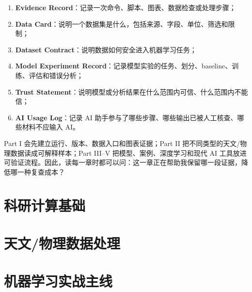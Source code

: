 \documentclass[11pt,a4paper,openany,fontset=fandol]{ctexbook}
\begin{document}
\begin{enumerate}
    \item \textbf{Evidence Record}：记录一次命令、脚本、图表、数据检查或处理步骤；
    \item \textbf{Data Card}：说明一个数据集是什么，包括来源、字段、单位、筛选和限制；
    \item \textbf{Dataset Contract}：说明数据如何安全进入机器学习任务；
    \item \textbf{Model Experiment Record}：记录模型实验的任务、划分、baseline、训练、评估和错误分析；
    \item \textbf{Trust Statement}：说明模型或分析结果在什么范围内可信、什么范围内不能信；
    \item \textbf{AI Usage Log}：记录 AI 助手参与了哪些步骤、哪些输出已被人工核查、哪些材料不应输入 AI。
\end{enumerate}

Part I 会先建立运行、版本、数据入口和图表证据；Part II 把不同类型的天文/物理数据读成可解释样本；Part III--V 把模型、案例、深度学习和现代 AI 工具放进可验证流程。因此，读每一章时都可以问：这一章正在帮助我保留哪一段证据，降低哪一种复查成本？

\part{科研计算基础}







\part{天文/物理数据处理}








\part{机器学习实战主线}












\end{document}
